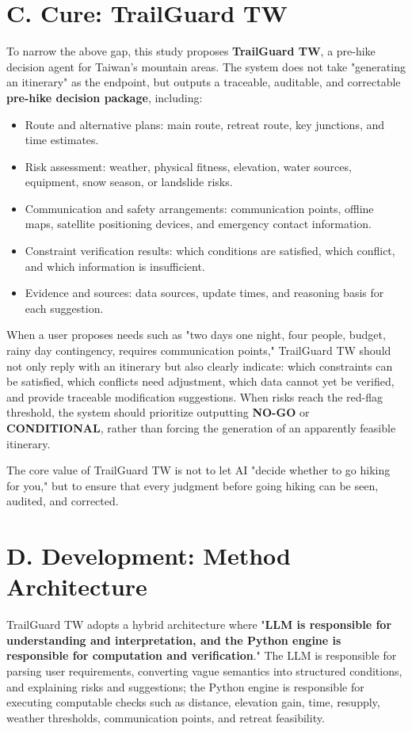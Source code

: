 \documentclass[conference]{IEEEtran}
\begin{document}
\section{C. Cure: TrailGuard TW}

To narrow the above gap, this study proposes \textbf{TrailGuard TW}, a pre-hike decision agent for Taiwan's mountain areas. The system does not take "generating an itinerary" as the endpoint, but outputs a traceable, auditable, and correctable \textbf{pre-hike decision package}, including:

\begin{itemize}
\item Route and alternative plans: main route, retreat route, key junctions, and time estimates.
\item Risk assessment: weather, physical fitness, elevation, water sources, equipment, snow season, or landslide risks.
\item Communication and safety arrangements: communication points, offline maps, satellite positioning devices, and emergency contact information.
\item Constraint verification results: which conditions are satisfied, which conflict, and which information is insufficient.
\item Evidence and sources: data sources, update times, and reasoning basis for each suggestion.
\end{itemize}

When a user proposes needs such as "two days one night, four people, budget, rainy day contingency, requires communication points," TrailGuard TW should not only reply with an itinerary but also clearly indicate: which constraints can be satisfied, which conflicts need adjustment, which data cannot yet be verified, and provide traceable modification suggestions. When risks reach the red-flag threshold, the system should prioritize outputting \textbf{NO-GO} or \textbf{CONDITIONAL}, rather than forcing the generation of an apparently feasible itinerary.

The core value of TrailGuard TW is not to let AI "decide whether to go hiking for you," but to ensure that every judgment before going hiking can be seen, audited, and corrected.

\section{D. Development: Method Architecture}

TrailGuard TW adopts a hybrid architecture where "\textbf{LLM is responsible for understanding and interpretation, and the Python engine is responsible for computation and verification}." The LLM is responsible for parsing user requirements, converting vague semantics into structured conditions, and explaining risks and suggestions; the Python engine is responsible for executing computable checks such as distance, elevation gain, time, resupply, weather thresholds, communication points, and retreat feasibility.
\end{document}
